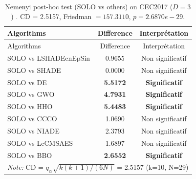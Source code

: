 \begin{center}
\small
\renewcommand{\arraystretch}{1.25}
\begin{longtable}{lcc}
\caption{Nemenyi post-hoc test (SOLO vs others) on CEC2017 ($D=3$) . CD = 2.5157, Friedman $=157.3110$, $p=2.6870e-29$.}
\label{tab:nemenyi_CEC2017_3} \\
\toprule
Algorithms & Difference & Interprétation \\
\midrule
\endfirsthead
\toprule
Algorithms & Difference & Interprétation \\
\midrule
\endhead
SOLO vs LSHADEcnEpSin & 0.9655 & Non significatif \\
SOLO vs SHADE & 0.0000 & Non significatif \\
SOLO vs DE & \textbf{5.5172} & \textbf{Significatif} \\
SOLO vs GWO & \textbf{4.7931} & \textbf{Significatif} \\
SOLO vs HHO & \textbf{5.4483} & \textbf{Significatif} \\
SOLO vs CCCO & 1.0690 & Non significatif \\
SOLO vs NIADE & 2.3793 & Non significatif \\
SOLO vs LcCMSAES & 1.6897 & Non significatif \\
SOLO vs BBO & \textbf{2.6552} & \textbf{Significatif} \\
\midrule
\multicolumn{3}{l}{\textit*{Note:} CD = $q_\alpha \sqrt{k(k+1)/(6N)}$ = 2.5157 (k=10, N=29)} \\
\bottomrule
\end{longtable}
\end{center}